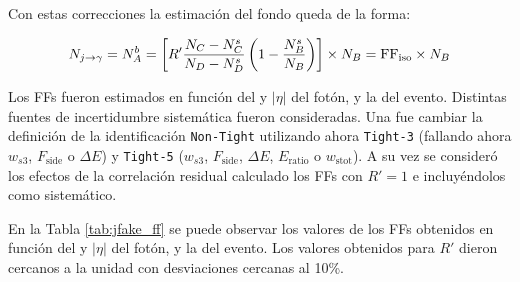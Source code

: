 Con estas correcciones la estimación del fondo queda de la forma:

\begin{equation}
    N_{j\to\gamma} = N_A^b = \left[R' \frac{N_C - N_C^s}{N_D - N_D^s} \left( 1 - \frac{N_B^s}{N_B} \right)  \right] \times N_B = \text{FF}_{\text{iso}} \times N_B \\
\end{equation}

Los FFs fueron estimados en función del \pt y $|\eta|$ del fotón, y la \met del evento. Distintas fuentes de incertidumbre sistemática fueron consideradas. Una fue cambiar la definición de la identificación \texttt{Non-Tight} utilizando ahora \texttt{Tight-3} (fallando ahora $w_{s3}$, $F_{\text{side}}$ o $\Delta E$) y \texttt{Tight-5} ($w_{s3}$, $F_{\text{side}}$, $\Delta E$, $E_{\text{ratio}}$ o $w_{\text{stot}}$). A su vez se consideró los efectos de la correlación residual calculado los FFs con $R'=1$ e incluyéndolos como sistemático.

En la Tabla \ref{tab:jfake_ff} se puede observar los valores de los FFs obtenidos en función del \pt y $|\eta|$ del fotón, y la \met del evento. Los valores obtenidos para $R'$ dieron cercanos a la unidad con desviaciones cercanas al 10\%.

